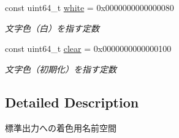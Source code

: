 \begin{DoxyCompactItemize}
const uint64\+\_\+t \mbox{\hyperlink{namespace_g_a_1_1color_a6e43291dbd13c3850c9c170b5c4f2adf}{white}} = 0x00\textquotesingle{}00\textquotesingle{}00\textquotesingle{}00\textquotesingle{}00\textquotesingle{}00\textquotesingle{}00\textquotesingle{}80
\begin{DoxyCompactList}\small\item\em 文字色（白）を指す定数 \end{DoxyCompactList}\item 
\mbox{\label{namespace_g_a_1_1color_aad6ec9e2efdea8fd6b30909e4bffd4cc}} 
const uint64\+\_\+t \mbox{\hyperlink{namespace_g_a_1_1color_aad6ec9e2efdea8fd6b30909e4bffd4cc}{clear}} = 0x00\textquotesingle{}00\textquotesingle{}00\textquotesingle{}00\textquotesingle{}00\textquotesingle{}00\textquotesingle{}01\textquotesingle{}00
\begin{DoxyCompactList}\small\item\em 文字色（初期化）を指す定数 \end{DoxyCompactList}\end{DoxyCompactItemize}


\subsection{Detailed Description}
標準出力への着色用名前空間 


